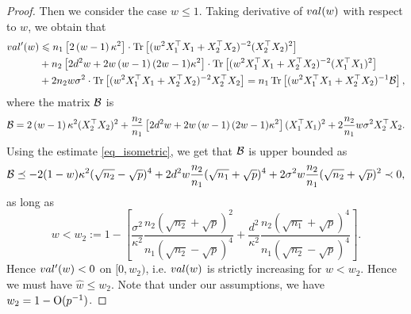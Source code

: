 \begin{proof}
Then we consider the case $w\le 1$. Taking derivative of $\val(w)$ with respect to $w$, we obtain that 
\begin{align}
	\val'(w) &\le n_1 \left[2\left( w-1\right) \kappa^2\right]\cdot \tr\left[( w^2X_1^{\top}X_1 +X_2^{\top}X_2)^{-2} (X_2^{\top}X_2)^2\right] \nonumber \\
	& + n_2\left[2d^2w +2w\left( w-1\right)(2w-1)\kappa^2\right]\cdot \tr\left[( w^2X_1^{\top}X_1 +X_2^{\top}X_2)^{-2} (X_1^{\top}X_1)^2\right] \nonumber\\
			& + 2n_2 w\sigma^2 \cdot \bigtr{(w^2X_1^{\top}X_1  + X_2^{\top}X_2)^{-2} X_2^\top X_2} = n_1 \bigtr{(w^2X_1^{\top}X_1  + X_2^{\top}X_2)^{-1} \cal B} , \nonumber
\end{align}
where the matrix $\cal B$ is 
$$\cal B= 2\left( w-1\right) \kappa^2  (X_2^{\top}X_2)^2+\frac{n_2}{n_1}\left[2d^2w +2w\left( w-1\right)(2w-1)\kappa^2\right](X_1^{\top}X_1)^2 + 2\frac{n_2}{n_1} w\sigma^2X_2^\top X_2.$$
Using the estimate \eqref{eq_isometric}, we get that $\cal B$ is upper bounded as
\begin{align*}
\cal B \preceq - 2(1-w)\kappa^2(\sqrt{n_2}-\sqrt{p})^4 +2d^2 w\frac{n_2}{n_1}(\sqrt{n_1}+\sqrt{p})^4 +2\sigma^2 w \frac{n_2}{n_1}(\sqrt{n_2}+\sqrt{p})^2\prec 0,
\end{align*}
as long as 
$$w< w_2:=1 - \left[ \frac{\sigma^2}{\kappa^2}\frac{n_2(\sqrt{n_2}+\sqrt{p})^2}{n_1(\sqrt{n_2}-\sqrt{p})^4}+ \frac{d^2}{\kappa^2}\frac{n_2(\sqrt{n_1}+\sqrt{p})^4}{n_1(\sqrt{n_2}-\sqrt{p})^4}\right].$$
Hence $\val'(w)<0$ on $[0,w_2)$, i.e. $\val(w)$ is strictly increasing for $w<w_2$. Hence we must have $\hat w\le w_2$. Note that under our assumptions, we have $w_2=1-\OO(p^{-1})$. 
\end{proof}

